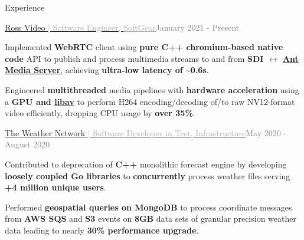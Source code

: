 \documentclass[hidelinks]{resume} %
\begin{document}
\begin{rSection}{\faBlackTie \hspace{0.25px} Experience}
\begin{rSubsection}{\href{https://www.rossvideo.com/products-services/infrastructure/softgear-software-based-signal-processing-platform/}{Ross Video \textcolor{darkgray}{| Software Engineer, \underline{SoftGear}}}}{\textcolor{gray}{January 2021 - Present}}{}

    \begin{bulletpoints}
        \vspace{-.10cm}
        \item Implemented \textbf{WebRTC} client using \textbf{pure C++ chromium-based native code} API to publish and process multimedia streams to and from \textbf{SDI $\leftrightarrow$ \href{https://antmedia.io/}{\underline{Ant Media Server}}}, achieving \textbf{ultra-low latency of \textasciitilde0.6s}.
        \vspace{-.13cm}
        \item Engineered \textbf{multithreaded} media pipelines with \textbf{hardware acceleration} using a \textbf{GPU and \href{https://libav.org/}{\underline{libav}}} to perform H264 encoding/decoding of/to raw NV12-format video efficiently, dropping CPU usage by \textbf{over 35\%}.
        \vspace{-.10cm}
    \end{bulletpoints}   
    \vspace{-.25cm}
\end{rSubsection}
\begin{rSubsection}{\href{https://www.theweathernetwork.com/}{The Weather Network \textcolor{darkgray}{| Software Developer in Test, Infrastructure}}}{\textcolor{gray}{May 2020 - August 2020}}{}
        \par
        \begin{bulletpoints}
            \vspace{-.10cm}
            \item Contributed to deprecation of \textbf{C++} monolithic forecast engine by developing \textbf{loosely coupled Go libraries} to \textbf{concurrently} process weather files serving \textbf{+4 million unique users}.
             \vspace{-.13cm}
            \item Performed \textbf{geospatial queries on MongoDB} to process coordinate messages from \textbf{AWS SQS} and \textbf{S3} events on \textbf{8GB} data sets of granular precision weather data leading to nearly \textbf{30\% performance upgrade}.

\end{bulletpoints}
\end{rSubsection}
\end{rSection}
\end{document}
